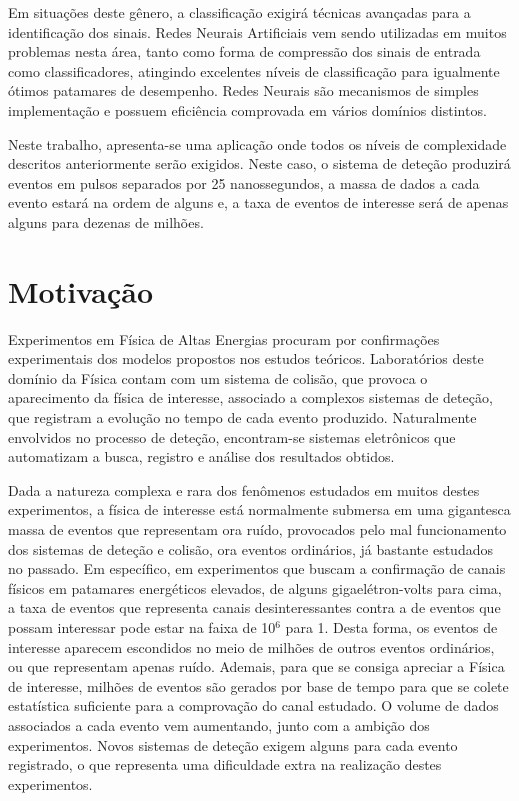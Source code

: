 Em situações deste gênero, a classificação exigirá técnicas avançadas para a
identificação dos sinais. Redes Neurais Artificiais vem sendo utilizadas em
muitos problemas nesta área, tanto como forma de compressão dos sinais de
entrada como classificadores, atingindo excelentes níveis de classificação
para igualmente ótimos patamares de desempenho. Redes Neurais são mecanismos
de simples implementação e possuem eficiência comprovada em vários domínios
distintos.

Neste trabalho, apresenta-se uma aplicação onde todos os níveis de
complexidade descritos anteriormente serão exigidos. Neste caso, o sistema de
deteção produzirá eventos em pulsos separados por 25 nanossegundos, a massa de
dados a cada evento estará na ordem de alguns  e, a taxa de
eventos de interesse será de apenas alguns para dezenas de milhões.

\section{Motivação}

Experimentos em Física de Altas Energias procuram por confirmações
experimentais dos modelos propostos nos estudos teóricos. Laboratórios deste
domínio da Física contam com um sistema de colisão, que provoca o aparecimento
da física de interesse, associado a complexos sistemas de deteção, que
registram a evolução no tempo de cada evento produzido. Naturalmente
envolvidos no processo de deteção, encontram-se sistemas eletrônicos que
automatizam a busca, registro e análise dos resultados obtidos.

Dada a natureza complexa e rara dos fenômenos estudados em muitos destes
experimentos, a física de interesse está normalmente submersa em uma
gigantesca massa de eventos que representam ora ruído, provocados pelo mal
funcionamento dos sistemas de deteção e colisão, ora eventos ordinários, já
bastante estudados no passado. Em específico, em experimentos que buscam a
confirmação de canais físicos em patamares energéticos elevados, de alguns
gigaelétron-volts para cima, a taxa de eventos que representa canais
desinteressantes contra a de eventos que possam interessar pode estar na faixa
de 10$^6$ para 1. Desta forma, os eventos de interesse aparecem escondidos no
meio de milhões de outros eventos ordinários, ou que representam apenas
ruído. Ademais, para que se consiga apreciar a Física de interesse, milhões de
eventos são gerados por base de tempo para que se colete estatística
suficiente para a comprovação do canal estudado. O volume de dados associados
a cada evento vem aumentando, junto com a ambição dos experimentos. Novos
sistemas de deteção exigem alguns  para cada evento registrado,
o que representa uma dificuldade extra na realização destes experimentos.

